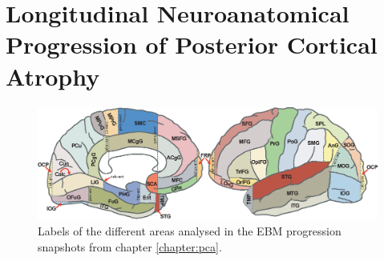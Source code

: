 
\chapter[Longitudinal Neuroanatomical Progression of PCA]{Longitudinal Neuroanatomical Progression of Posterior Cortical Atrophy}
\label{sec:adni_extra_appendix}


\newcommand*{\scaleLabelImg}{0.7}
\begin{figure}
  \centering
  \includegraphics*[scale=\scaleLabelImg]{images/Mid-Lateral_surface3.eps}
  \caption[Labels of the different areas analysed in the EBM progression snapshots]{Labels of the different areas analysed in the EBM progression snapshots from chapter \ref{chapter:pca}. }
  \label{fig:ebmSnapLabels}
\end{figure}



